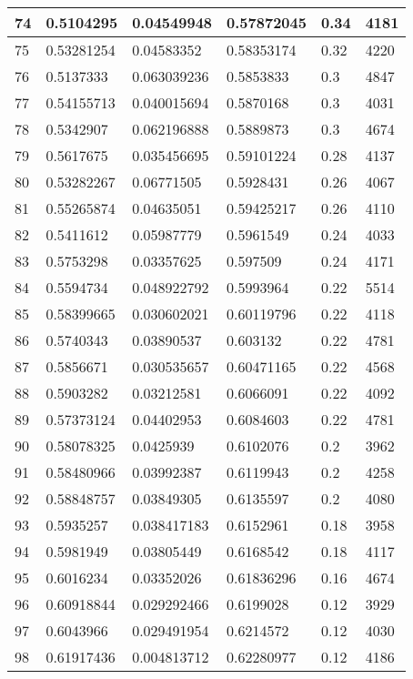 \begin{longtable}{|l|l|l|l|l|l|}
74 & 0.5104295 & 0.04549948 & 0.57872045 & 0.34 & 4181 \\ \hline 
75 & 0.53281254 & 0.04583352 & 0.58353174 & 0.32 & 4220 \\ \hline 
76 & 0.5137333 & 0.063039236 & 0.5853833 & 0.3 & 4847 \\ \hline 
77 & 0.54155713 & 0.040015694 & 0.5870168 & 0.3 & 4031 \\ \hline 
78 & 0.5342907 & 0.062196888 & 0.5889873 & 0.3 & 4674 \\ \hline 
79 & 0.5617675 & 0.035456695 & 0.59101224 & 0.28 & 4137 \\ \hline 
80 & 0.53282267 & 0.06771505 & 0.5928431 & 0.26 & 4067 \\ \hline 
81 & 0.55265874 & 0.04635051 & 0.59425217 & 0.26 & 4110 \\ \hline 
82 & 0.5411612 & 0.05987779 & 0.5961549 & 0.24 & 4033 \\ \hline 
83 & 0.5753298 & 0.03357625 & 0.597509 & 0.24 & 4171 \\ \hline 
84 & 0.5594734 & 0.048922792 & 0.5993964 & 0.22 & 5514 \\ \hline 
85 & 0.58399665 & 0.030602021 & 0.60119796 & 0.22 & 4118 \\ \hline 
86 & 0.5740343 & 0.03890537 & 0.603132 & 0.22 & 4781 \\ \hline 
87 & 0.5856671 & 0.030535657 & 0.60471165 & 0.22 & 4568 \\ \hline 
88 & 0.5903282 & 0.03212581 & 0.6066091 & 0.22 & 4092 \\ \hline 
89 & 0.57373124 & 0.04402953 & 0.6084603 & 0.22 & 4781 \\ \hline 
90 & 0.58078325 & 0.0425939 & 0.6102076 & 0.2 & 3962 \\ \hline 
91 & 0.58480966 & 0.03992387 & 0.6119943 & 0.2 & 4258 \\ \hline 
92 & 0.58848757 & 0.03849305 & 0.6135597 & 0.2 & 4080 \\ \hline 
93 & 0.5935257 & 0.038417183 & 0.6152961 & 0.18 & 3958 \\ \hline 
94 & 0.5981949 & 0.03805449 & 0.6168542 & 0.18 & 4117 \\ \hline 
95 & 0.6016234 & 0.03352026 & 0.61836296 & 0.16 & 4674 \\ \hline 
96 & 0.60918844 & 0.029292466 & 0.6199028 & 0.12 & 3929 \\ \hline 
97 & 0.6043966 & 0.029491954 & 0.6214572 & 0.12 & 4030 \\ \hline 
98 & 0.61917436 & 0.004813712 & 0.62280977 & 0.12 & 4186 \\ \hline 

\end{longtable}
